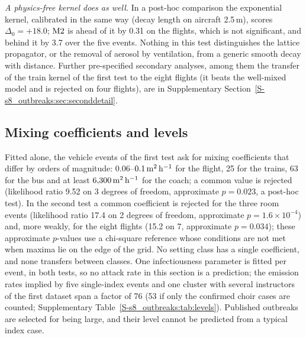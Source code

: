 \emph{A physics-free kernel does as well.} In a post-hoc comparison the exponential kernel, calibrated in the
same way (decay length on aircraft 2.5\,m), scores $\Delta_0=+18.0$; $\mathrm{M2}$ is ahead of it by 0.31 on the
flights, which is not significant, and behind it by 3.7 over the five events. Nothing in this test distinguishes
the lattice propagator, or the removal of aerosol by ventilation, from a generic smooth decay with distance.
Further pre-specified secondary analyses, among them the transfer of the train kernel of the first test to the
eight flights (it beats the well-mixed model and is rejected on four flights), are in Supplementary
Section~\ref{S-s8_outbreaks:sec:seconddetail}.

\subsection{Mixing coefficients and levels}\label{s8_outbreaks:sec:mixing}\label{s8_outbreaks:sec:levels}

Fitted alone, the vehicle events of the first test ask for mixing coefficients that differ by orders of
magnitude: 0.06--$0.1\,\mathrm{m}^2\,\mathrm{h}^{-1}$ for the flight, 25 for the trains, 63 for the bus and at least $6{,}300\,\mathrm{m}^2\,\mathrm{h}^{-1}$ for the
coach; a common value is rejected (likelihood ratio 9.52 on 3 degrees of freedom, approximate $p=0.023$, a post-hoc
test). In the second test a common coefficient is rejected for the three room events (likelihood ratio 17.4 on
2 degrees of freedom, approximate $p=1.6\times10^{-4}$) and, more weakly, for the eight flights (15.2 on 7,
approximate $p=0.034$); these approximate $p$-values use a chi-square reference whose conditions are not met when
maxima lie on the edge of the grid. No setting class has a single coefficient, and none transfers between
classes. One infectiousness parameter is fitted per event, in both tests, so no attack rate in this section is a
prediction; the emission rates implied by five single-index events and one cluster with several instructors
of the first dataset span a factor of 76 (53 if only the confirmed choir cases are counted;
Supplementary Table~\ref{S-s8_outbreaks:tab:levels}). Published outbreaks are selected for being large, and
their level cannot be predicted from a typical index case.

